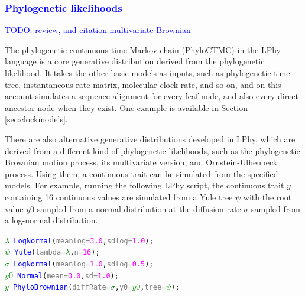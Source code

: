 \documentclass[10pt,letterpaper,table]{article}
\begin{document}
{%
\textcolor{blue}{\subsubsection{Phylogenetic likelihoods}}

\textcolor{blue}{TODO: review, and citation multivariate Brownian}

The phylogenetic continuous-time Markov chain (PhyloCTMC) \cite{felsenstein1981} in the LPhy language is a core generative distribution derived from the phylogenetic likelihood. It takes the other basic models as inputs, such as phylogenetic time tree, instantaneous rate matrix, molecular clock rate, and so on, and on this account simulates a sequence alignment for every leaf node, and also every direct ancestor node when they exist. One example is available in Section \ref{sec:clockmodels}.

There are also alternative generative distributions developed in LPhy, which are derived from a different kind of phylogenetic likelihoods, such as the phylogenetic Brownian motion process\cite{felsenstein1973maximum}, its multivariate version\cite{}, and Ornstein-Ulhenbeck process\cite{felsenstein1973maximum}. Using them, a continuous trait can be simulated from the specified models.
For example, running the following LPhy script, the continuous trait $y$ containing 16 continuous values are simulated from a Yule tree $\psi$ with the root value $y0$ sampled from a normal distribution at the diffusion rate $\sigma$ sampled from a log-normal distribution.

{\singlespacing
\begin{alltt}
  \textcolor{green}{\(\lambda\)} ~ \textcolor{blue}{LogNormal}(\textcolor{gray}{meanlog=}\textcolor{magenta}{3.0}, \textcolor{gray}{sdlog=}\textcolor{magenta}{1.0});
  \textcolor{green}{\(\psi\)} ~ \textcolor{blue}{Yule}(\textcolor{gray}{lambda=}\textcolor{green}{\(\lambda\)}, \textcolor{gray}{n=}\textcolor{magenta}{16});
  \textcolor{green}{\(\sigma\)} ~ \textcolor{blue}{LogNormal}(\textcolor{gray}{meanlog=}\textcolor{magenta}{1.0}, \textcolor{gray}{sdlog=}\textcolor{magenta}{0.5});
  \textcolor{green}{\(y0\)} ~ \textcolor{blue}{Normal}(\textcolor{gray}{mean=}\textcolor{magenta}{0.0}, \textcolor{gray}{sd=}\textcolor{magenta}{1.0});
  \textcolor{green}{\(y\)} ~ \textcolor{blue}{PhyloBrownian}(\textcolor{gray}{diffRate=}\textcolor{green}{\(\sigma\)}, \textcolor{gray}{y0=}\textcolor{green}{\(y0\)}, \textcolor{gray}{tree=}\textcolor{green}{\(\psi\)});
\end{alltt}
}



}
\end{document}
